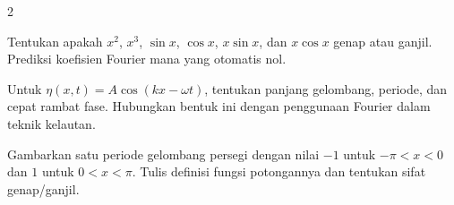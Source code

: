 \documentclass[10pt,a4paper]{article}
\newcommand{\level}[1]{\colorbox{levelbg}{\scriptsize\strut #1}}
\newcommand{\src}[1]{\colorbox{sourcebg}{\scriptsize\strut #1}}
\begin{document}
\begin{multicols}{2}
\begin{qbox}[title={M5.7: Asal koefisien Fourier\hfill \level{L3}\;\src{PR}}]
\end{qbox}
\begin{qbox}[title={M5.8: Even dan odd\hfill \level{L2}\;\src{Var}}]
\small Tentukan apakah $x^2$, $x^3$, $\sin x$, $\cos x$, $x\sin x$, dan $x\cos x$ genap atau ganjil. Prediksi koefisien Fourier mana yang otomatis nol.
\end{qbox}
\begin{qbox}[title={M5.9: Gelombang progresif\hfill \level{L2}\;\src{Var}}]
\small Untuk $\eta(x,t)=A\cos(kx-\omega t)$, tentukan panjang gelombang, periode, dan cepat rambat fase. Hubungkan bentuk ini dengan penggunaan Fourier dalam teknik kelautan.
\end{qbox}
\begin{qbox}[title={M5.10: Dari grafik ke fungsi potongan\hfill \level{L3}\;\src{Var}}]
\small Gambarkan satu periode gelombang persegi dengan nilai $-1$ untuk $-\pi<x<0$ dan $1$ untuk $0<x<\pi$. Tulis definisi fungsi potongannya dan tentukan sifat genap/ganjil.
\end{qbox}
\end{multicols}
\newpage
\end{document}
